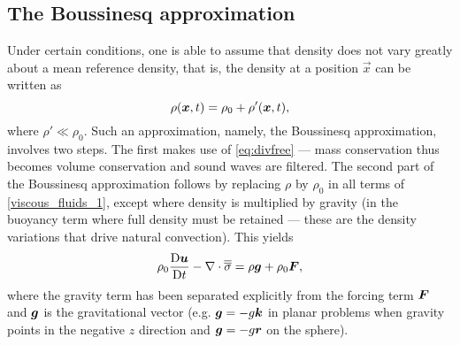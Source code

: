 \subsection{The Boussinesq approximation} \label{sec:boussinesq_approximation}

Under certain conditions, one is able to assume that density does not vary greatly about a mean reference density, that is, the density at a position $\vec x$ can be written as
\begin{equation}
\rho({\mbox{\boldmath$x$}},t) = \rho_0 + \rho'({\mbox{\boldmath$x$}},t),
\end{equation}
where $\rho'\ll\rho_0$. Such an approximation, namely, the Boussinesq
approximation, involves two steps. The first makes use of \eqref{eq:divfree} ---
mass conservation thus becomes volume conservation and sound waves are filtered.
The second part of the Boussinesq approximation follows by replacing $\rho$ by
$\rho_0$ in all terms of \eqref{viscous_fluids_1}, except where density is
multiplied by gravity (\ie in the buoyancy term where full density must be retained --- these are the density variations that drive natural convection). This yields
\begin{equation}
\rho_0\frac{\mathrm{D}{\mbox{\boldmath$u$}}}{\mathrm{D} t} -\nabla\cdot\overline{\overline{\sigma}} = \rho {\mbox{\boldmath$g$}} + \rho_0{\mbox{\boldmath$F$}},
\end{equation}
where the gravity term has been separated explicitly from the forcing term ${\mbox{\boldmath$F$}}$ and ${\mbox{\boldmath$g$}}$ is the gravitational vector (e.g. ${\mbox{\boldmath$g$}} = -g{\mbox{\boldmath$k$}}$ in planar problems when gravity points in the negative $z$ direction and ${\mbox{\boldmath$g$}} = -g{\mbox{\boldmath$r$}}$ on the sphere).

